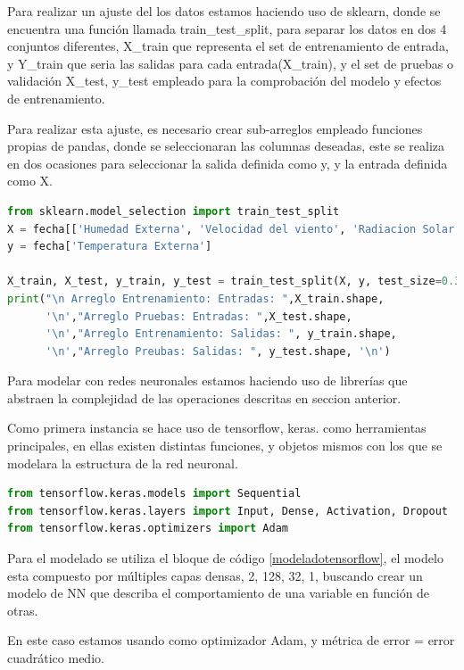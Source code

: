 Para realizar un ajuste del los datos estamos haciendo uso de sklearn, donde se
encuentra una función llamada train\_test\_split, para separar los datos en dos
4 conjuntos diferentes, X\_train que representa el set de entrenamiento de
entrada, y Y\_train que seria las salidas para cada entrada(X\_train), y el set
de pruebas o validación X\_test, y\_test empleado para la comprobación del
modelo y efectos de entrenamiento.


Para realizar esta ajuste, es necesario crear sub-arreglos empleado funciones
propias de pandas, donde se seleccionaran las columnas deseadas, este se
realiza en dos ocasiones para seleccionar la salida definida como y, y la
entrada definida como X.

\begin{lstlisting}[language=Python, caption=Ajuste de los datos]
from sklearn.model_selection import train_test_split
X = fecha[['Humedad Externa', 'Velocidad del viento', 'Radiacion Solar']]
y = fecha['Temperatura Externa']

X_train, X_test, y_train, y_test = train_test_split(X, y, test_size=0.3, random_state=42)
print("\n Arreglo Entrenamiento: Entradas: ",X_train.shape, 
      '\n',"Arreglo Pruebas: Entradas: ",X_test.shape,
      '\n',"Arreglo Entrenamiento: Salidas: ", y_train.shape,
      '\n',"Arreglo Preubas: Salidas: ", y_test.shape, '\n')
\end{lstlisting}
Para modelar con redes neuronales estamos haciendo uso de librerías que
abstraen la complejidad de las operaciones descritas en seccion anterior. 

Como primera instancia se hace uso de tensorflow, keras. como herramientas
principales, en ellas existen distintas funciones, y objetos  mismos con los
que se modelara la estructura de la red neuronal.  

\begin{lstlisting}[language=Python, caption=Librerias empleadas para modelado de NN]
from tensorflow.keras.models import Sequential
from tensorflow.keras.layers import Input, Dense, Activation, Dropout
from tensorflow.keras.optimizers import Adam
\end{lstlisting}


Para el modelado se utiliza el bloque de código \ref{modeladotensorflow}, el
modelo esta compuesto por múltiples capas densas, 2, 128, 32, 1, buscando crear
un modelo de NN que describa el comportamiento de una variable en función de
otras.

En este  caso estamos usando como optimizador Adam, y métrica de error = error
cuadrático medio. 

